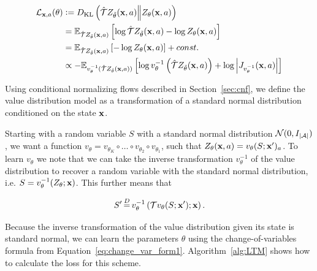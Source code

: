 \documentclass[twoside]{article}
\begin{document}
\begin{align}
  \mathcal{L}_{\textbf{x},a}(\theta) & \vcentcolon= D_{\mathrm{KL}}\left( \hat{\mathcal{T}}
  Z_{\tilde{\theta}}(\textbf{x},a) \middle\Vert Z_{\theta}(\textbf{x},a) \right)                                                                       \\
                               & = \mathbb{E}_{\hat{\mathcal{T}} Z_{\tilde{\theta}}(\textbf{x},a)} \left[ \log \hat{\mathcal{T}}
  Z_{\tilde{\theta}}(\textbf{x},a) - \log Z_{\theta}(\textbf{x},a) \right]\nonumber                                                        \\
                               & = \mathbb{E}_{\hat{\mathcal{T}} Z_{\tilde{\theta}}(\textbf{x},a)} \left[ - \log Z_{\theta}(\textbf{x},a) \right] + const.\nonumber \\
                               & \propto -\mathbb{E}_{v_\theta^{-1}(\hat{\mathcal{T}} Z_{\tilde{\theta}}(\textbf{x},a))} \left[ 
    \log v^{-1}_\theta \left( \hat{\mathcal{T}} Z_{\tilde{\theta}}(\textbf{x},a) \right) + \log \left\lvert J_{v_\theta^{-1}}(\textbf{x}, a) \right\rvert \right]\nonumber
\end{align}

Using conditional normalizing flows described in Section~\ref{sec:cnf}, we
define the value distribution model as a transformation of a
standard normal distribution conditioned on the state \(\textbf{x}\).


Starting with a random variable \(S\) with a standard normal distribution
\(\mathcal{N}(0, I_{\lvert \mathcal{A} \rvert})\), we want a function \(v_\theta = v_{\theta_K}
\circ \dots \circ v_{\theta_2} \circ v_{\theta_1} \), such that
\(Z_\theta(\textbf{x}, a) = v_\theta(S; \textbf{x}^\prime)_a\). To learn \(v_\theta\) we note that
we can take the inverse transformation \(v^{-1}_\theta\) of the value
distribution to recover a random variable with the standard normal distribution,
i.e. \(S = v^{-1}_\theta(Z_\theta; \textbf{x})\). This further means that

\begin{equation}
  S^\prime \eqdist v^{-1}_\theta \left(\T v_\theta(S; \rvx^\prime); \rvx \right).
\end{equation}

Because the inverse transformation of the value distribution given its state is
standard normal, we can learn the parameters \(\theta\) using the
change-of-variables formula from Equation~\ref{eq:change_var_form1}.
Algorithm~\ref{alg:LTM} shows how to calculate the loss for this scheme.
\end{document}

